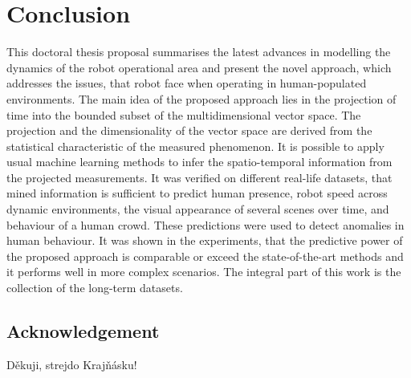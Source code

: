 \section{Conclusion\label{sec:conclusion}}

This doctoral thesis proposal summarises the latest advances in modelling the dynamics of the robot operational area and present the novel approach, which addresses the issues, that robot face when operating in human-populated environments.
The main idea of the proposed approach lies in the projection of time into the bounded subset of the multidimensional vector space.
The projection and the dimensionality of the vector space are derived from the statistical characteristic of the measured phenomenon.
It is possible to apply usual machine learning methods to infer the spatio-temporal information from the projected measurements.
It was verified on different real-life datasets, that mined information is sufficient to predict human presence, robot speed across dynamic environments, the visual appearance of several scenes over time, and behaviour of a human crowd.
These predictions were used to detect anomalies in human behaviour.
It was shown in the experiments, that the predictive power of the proposed approach is comparable or exceed the state-of-the-art methods and it performs well in more complex scenarios.
The integral part of this work is the collection of the long-term datasets.

\subsection{Acknowledgement}
D{\v e}kuji, strejdo Kraj{\v n}{\' a}sku!
